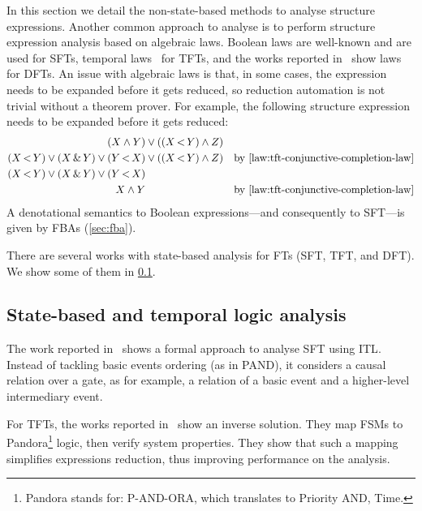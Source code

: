 \documentclass[12pt,openright,twoside,a4paper,oldfontcommands,english,brazil,final]{abntex2}
\newcommand{\todo}[1]{\adnote{#1}}
\theoremstyle{theo}
\def\pandora{Pandora\footnote{Pandora stands for: P-AND-ORA, which translates to Priority AND, Time.}%
  \gdef\pandora{Pandora\xspace}%
  \xspace}
\newcommand{\parsin}[1]{\ensuremath\left( #1 \right)}
\def\pand{\ensuremath\operatorname{<}}
\def\sand{\ensuremath\operatorname{\&}}
\begin{document}
In this section we detail the non-state-based methods to analyse structure expressions.
Another common approach to analyse  is to perform structure expression analysis based on algebraic laws.
Boolean laws are well-known and are used for \acp{SFT}, temporal laws~\cite{Walker2009,WP2010} for \acp{TFT}, and the works reported in~\cite{Merle2010,MRL2011} show laws for \acp{DFT}.
An issue with algebraic laws is that, in some cases, the expression needs to be expanded before it gets reduced, so reduction automation is not trivial without a theorem prover.
For example, the following  structure expression needs to be expanded \cite{WP2010} before it gets reduced:
\begin{align*}
  \parsin{X \land Y} & \lor \parsin{\parsin{X \pand Y} \land Z} &\\
  \parsin{X \pand Y} \lor \parsin{X \sand Y} \lor \parsin{Y \pand X} & \lor \parsin{\parsin{X \pand Y} \land Z} & \text{by \cref{law:tft-conjunctive-completion-law}}\\
  \parsin{X \pand Y} \lor \parsin{X \sand Y} \lor \parsin{Y \pand X} & &\\
  X \land Y & & \text{by \cref{law:tft-conjunctive-completion-law}}
\end{align*}
%
A denotational semantics to Boolean expressions---and consequently to \ac{SFT}---is given by \acp{FBA} (\cref{sec:fba}).

There are several works with state-based analysis for \acp{FT} (\ac{SFT}, \ac{TFT}, and \ac{DFT}).
We show some of them in \cref{sec:ft-state-based-analysis}.

\subsection{State-based and temporal logic analysis}
\label{sec:ft-state-based-analysis}

The work reported in~\cite{STR2002} shows a formal approach to analyse \ac{SFT} using \ac{ITL}.
Instead of tackling basic events ordering (as in \ac{PAND}), it considers a causal relation over a gate, as for example, a relation of a basic event and a higher-level intermediary event.

For \acp{TFT}, the works reported in~\cite{MPW2010,MWP2012} show an inverse solution.
They map \acp{FSM} to \pandora logic, then verify system properties.
They show that such a mapping simplifies expressions reduction, thus improving performance on the analysis.
\end{document}
